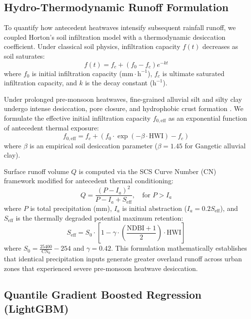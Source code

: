 \documentclass[OA,linenum]{InterPore}
\begin{document}
\subsection{Hydro-Thermodynamic Runoff Formulation}

To quantify how antecedent heatwaves intensify subsequent rainfall runoff, we coupled Horton's soil infiltration model with a thermodynamic desiccation coefficient. Under classical soil physics, infiltration capacity $f(t)$ decreases as soil saturates:
\begin{equation}
    f(t) = f_c + (f_0 - f_c) e^{-k t}
\end{equation}
where $f_0$ is initial infiltration capacity ($\text{mm}\cdot\text{h}^{-1}$), $f_c$ is ultimate saturated infiltration capacity, and $k$ is the decay constant ($\text{h}^{-1}$).

Under prolonged pre-monsoon heatwaves, fine-grained alluvial silt and silty clay undergo intense desiccation, pore closure, and hydrophobic crust formation \cite{Rohini2025, Ganguli2025}. We formulate the effective initial infiltration capacity $f_{0,\text{eff}}$ as an exponential function of antecedent thermal exposure:
\begin{equation}
    f_{0,\text{eff}} = f_c + (f_0 \cdot \exp(-\beta \cdot \text{HWI}) - f_c)
\end{equation}
where $\beta$ is an empirical soil desiccation parameter ($\beta = 1.45$ for Gangetic alluvial clay).

Surface runoff volume $Q$ is computed via the SCS Curve Number (CN) framework modified for antecedent thermal conditioning:
\begin{equation}
    Q = \frac{(P - I_a)^2}{P - I_a + S_{\text{eff}}}, \quad \text{for } P > I_a
\end{equation}
where $P$ is total precipitation (mm), $I_a$ is initial abstraction ($I_a = 0.2 S_{\text{eff}}$), and $S_{\text{eff}}$ is the thermally degraded potential maximum retention:
\begin{equation}
    S_{\text{eff}} = S_0 \cdot \left[1 - \gamma \cdot \left(\frac{\text{NDBI} + 1}{2}\right) \cdot \text{HWI}\right]
\end{equation}
where $S_0 = \frac{25400}{\text{CN}_0} - 254$ and $\gamma = 0.42$. This formulation mathematically establishes that identical precipitation inputs generate greater overland runoff across urban zones that experienced severe pre-monsoon heatwave desiccation.

\subsection{Quantile Gradient Boosted Regression (LightGBM)}
\end{document}
